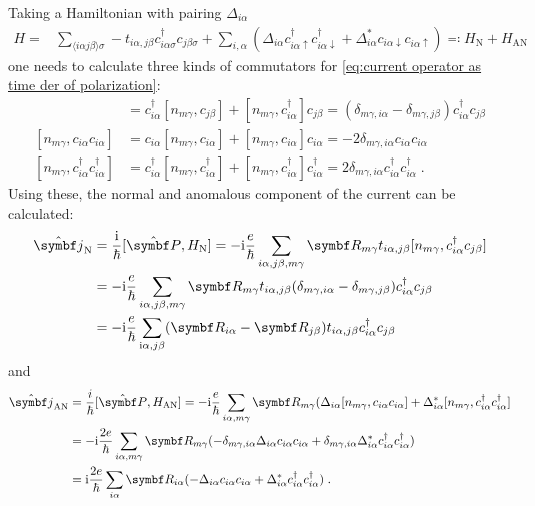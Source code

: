 \documentclass[../main.tex]{subfiles}
\begin{document}
Taking a Hamiltonian with pairing \(\Delta_{i \alpha}\)
\begin{align}
	H = &\sum_{\langle i \alpha j \beta \rangle \sigma} -t_{i \alpha, j \beta} c_{i \alpha \sigma}^{\dagger} c_{j \beta \sigma} + \sum_{i, \alpha} \left(\Delta_{i \alpha} c_{i \alpha \uparrow}^{\dagger} c_{i \alpha \downarrow}^{\dagger} + \Delta_{i \alpha}^{*} c_{i \alpha \downarrow} c_{i \alpha \uparrow}\right) \eqcolon H_{\mathrm{N}} + H_{\mathrm{AN}}
\end{align}
one needs to calculate three kinds of commutators for \cref{eq:current operator as time der of polarization}:
\begin{align}
	[n_{m \gamma}, c_{i \alpha}^{\dagger} c_{j \beta}] &= c_{i \alpha}^{\dagger} [n_{m \gamma}, c_{j \beta}] + [n_{m \gamma}, c_{i \alpha}^{\dagger}] c_{j \beta} = (\delta_{m\gamma, i\alpha} - \delta_{m\gamma, j\beta}) c_{i \alpha}^{\dagger} c_{j \beta} \\
	[n_{m \gamma}, c_{i \alpha} c_{i \alpha}] &= c_{i \alpha} [n_{m \gamma}, c_{i \alpha}] + [n_{m \gamma}, c_{i \alpha}] c_{i \alpha} = -2 \delta_{m\gamma, i\alpha} c_{i \alpha} c_{i \alpha} \\
	[n_{m \gamma}, c_{i \alpha}^{\dagger} c_{i \alpha}^{\dagger}] &= c_{i \alpha}^{\dagger} [n_{m \gamma}, c_{i \alpha}^{\dagger}] + [n_{m \gamma}, c_{i \alpha}^{\dagger}] c_{i \alpha}^{\dagger} = 2 \delta_{m\gamma, i\alpha} c_{i \alpha}^{\dagger} c_{i \alpha}^{\dagger} \;.
\end{align}
Using these, the normal and anomalous component of the current can be calculated:
\begin{align}
	\ope{\vb{j}}_{\mathrm{N}} &= \frac{\iu}{\hbar} [\ope{\vb{P}}, H_{\mathrm{N}}] = -\iu \frac{e}{\hbar} \sum_{i\alpha, j\beta, m\gamma} \vb{R}_{m \gamma} t_{i \alpha, j \beta} [n_{m \gamma}, c_{i \alpha}^{\dagger} c_{j \beta}] \nonumber \\
	&= -\iu \frac{e}{\hbar} \sum_{i\alpha, j\beta, m\gamma} \vb{R}_{m \gamma} t_{i \alpha, j \beta} (\delta_{m\gamma, i\alpha} - \delta_{m\gamma, j\beta}) c_{i \alpha}^{\dagger} c_{j \beta} \nonumber \\
	&= -\iu \frac{e}{\hbar} \sum_{\iu \alpha, j\beta} (\vb{R}_{i \alpha} - \vb{R}_{j \beta}) t_{i \alpha, j \beta} c_{i \alpha}^{\dagger} c_{j \beta}
\end{align}
and
\begin{align}
	\ope{\vb{j}}_{\mathrm{AN}} &= \frac{i}{\hbar} [\ope{\vb{P}}, H_{\mathrm{AN}}] = -\iu \frac{e}{\hbar} \sum_{i\alpha, m\gamma} \vb{R}_{m \gamma} (\Delta_{i \alpha} [n_{m \gamma}, c_{i \alpha} c_{i \alpha}] + \Delta_{i \alpha}^* [n_{m \gamma}, c_{i \alpha}^{\dagger} c_{i \alpha}^{\dagger}] \nonumber \\
	&= -\iu \frac{2 e}{\hbar} \sum_{i\alpha, m\gamma} \vb{R}_{m \gamma} (-\delta_{m\gamma, i\alpha} \Delta_{i \alpha} c_{i \alpha} c_{i \alpha} + \delta_{m\gamma, i\alpha} \Delta_{i \alpha}^* c_{i \alpha}^{\dagger} c_{i \alpha}^{\dagger}) \nonumber \\
	&= \iu \frac{2 e}{\hbar} \sum_{i\alpha} \vb{R}_{i \alpha} (- \Delta_{i \alpha} c_{i \alpha} c_{i \alpha} + \Delta_{i \alpha}^* c_{i \alpha}^{\dagger} c_{i \alpha}^{\dagger}) \;.
\end{align}
\end{document}
